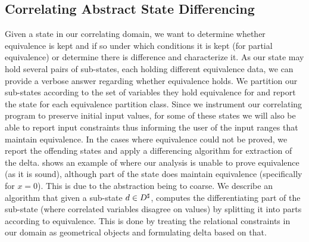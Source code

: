 \subsection{Correlating Abstract State Differencing} 
Given a state in our correlating domain, we want to determine whether equivalence is kept and if so under which conditions it is kept (for partial equivalence) or determine there is difference and characterize it. As our state may hold several pairs of sub-states, each holding different equivalence data, we can provide a verbose answer regarding whether equivalence holds. We partition our sub-states according to the set of variables they hold equivalence for and report the state for each equivalence partition class. Since we instrument our correlating program to preserve initial input values, for some of these states we will also be able to report input constraints thus informing the user of the input ranges that maintain equivalence. In the cases where equivalence could not be proved, we report the offending states and apply a differencing algorithm for extraction of the delta.  shows an example of where our analysis is unable to prove equivalence (as it is sound), although part of the state does maintain equivalence (specifically for $x=0$). This is due to the abstraction being to coarse. We describe an algorithm that given a sub-state $d \in D^\sharp$, computes the differentiating part of the sub-state (where correlated variables disagree on values) by splitting it into parts according to equivalence. This is done by treating the relational constraints in our domain as geometrical objects and formulating delta based on that.

